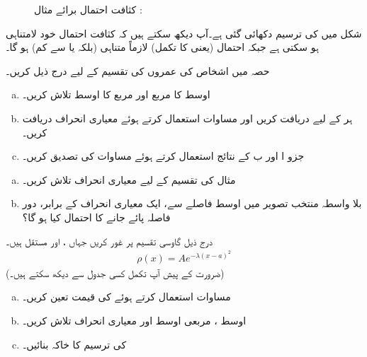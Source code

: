 \begin{figure}
\centering
{}
\caption{کثافت احتمال برائے مثال : }
\label{شکل_تفاعل_موج_کثافت_احتمال_برائے_مثال}
\end{figure}


 شکل    میں    کی ترسیم دکھائی گئی ہے۔آپ دیکھ سکتے ہیں کہ کثافت احتمال خود لامتناہی ہو سکتی ہے جبکہ  احتمال (یعنی  کا تکمل) لازماً  متناہی (بلکہ   یا  سے کم) ہو گا۔

 حصہ  میں اشخاص کی عمروں کی تقسیم کے لیے درج ذیل کریں۔ 
\begin{enumerate}[a.]
\item
اوسط کا مربع  اور مربع کا اوسط  تلاش کریں۔ 
\item
 ہر   کے لیے  دریافت کریں اور مساوات  استعمال کرتے ہوئے  معیاری انحراف دریافت کریں۔
\item
 جزو ا اور ب کے نتائج استعمال کرتے ہوئے مساوات   کی تصدیق کریں۔ 
\end{enumerate}
\begin{enumerate}[a.]
\item
 مثال  کی تقسیم کے لیے معیاری انحراف تلاش کریں۔
\item
بلا واسطہ منتخب تصویر میں  اوسط فاصلے سے، ایک معیاری انحراف کے برابر، دور فاصلہ  پائے جانے کا احتمال کیا ہو گا؟
\end{enumerate}
درج ذیل گاوسی تقسیم پر غور کریں  جہاں    ،  اور  مستقل ہیں۔  
\begin{align*}
\rho(x)=Ae^{-\lambda(x-a)^2}
\end{align*}
   (ضرورت کے پیش آپ تکمل کسی جدول سے دیکھ سکتے ہیں۔)
\begin{enumerate}[a.]
\item
مساوات استعمال کرتے ہوئے   کی قیمت تعین کریں۔
\item
اوسط ، مربعی اوسط  اور معیاری انحراف  تلاش کریں۔
\item
{} کی ترسیم کا خاکہ بنائیں۔
\end{enumerate}

